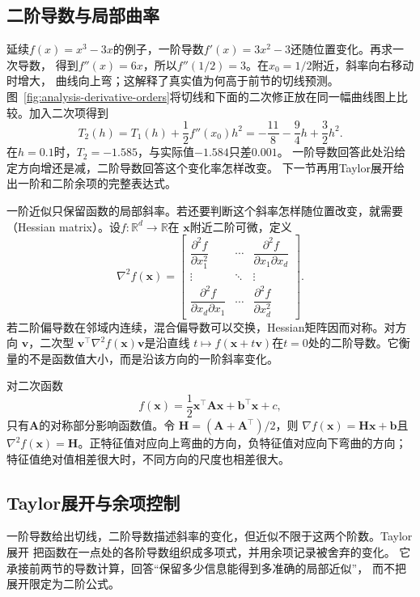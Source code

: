 \subsection{二阶导数与局部曲率}
\label{sec:analysis-second-order-curvature}

延续$f(x)=x^3-3x$的例子，一阶导数$f'(x)=3x^2-3$还随位置变化。再求一次导数，
得到$f''(x)=6x$，所以$f''(1/2)=3$。在$x_0=1/2$附近，斜率向右移动时增大，
曲线向上弯；这解释了真实值为何高于前节的切线预测。图~\ref{fig:analysis-derivative-orders}将切线和下面的二次修正放在同一幅曲线图上比较。加入二次项得到
\begin{equation}
  T_2(h)=T_1(h)+\frac12f''(x_0)h^2
        =-\frac{11}{8}-\frac94h+\frac32h^2.
\label{eq:analysis-cubic-quadratic-model}
\end{equation}
在$h=0.1$时，$T_2=-1.585$，与实际值$-1.584$只差$0.001$。
一阶导数回答此处沿给定方向增还是减，二阶导数回答这个变化率怎样改变。
下一节再用Taylor展开给出一阶和二阶余项的完整表达式。

一阶近似只保留函数的局部斜率。若还要判断这个斜率怎样随位置改变，就需要
（Hessian matrix）。设$f:\mathbb{R}^d\to\mathbb{R}$在 $\bm{x}$附近二阶可微，定义
\[   \nabla^2 f(\bm{x})   =
\begin{bmatrix}     \dfrac{\partial^2 f}{\partial x_1^2} &     \cdots &     \dfrac{\partial^2 f}{\partial x_1\partial x_d}\\     \vdots & \ddots & \vdots\\     \dfrac{\partial^2 f}{\partial x_d\partial x_1} &     \cdots &     \dfrac{\partial^2 f}{\partial x_d^2}
\end{bmatrix}. \]
若二阶偏导数在邻域内连续，混合偏导数可以交换，Hessian矩阵因而对称。对方向 $\bm{v}$，二次型 $\bm{v}^{\top}\nabla^2f(\bm{x})\bm{v}$是沿直线 $t\mapsto f(\bm{x}+t\bm{v})$在$t=0$处的二阶导数。它衡量的不是函数值大小，而是沿该方向的一阶斜率变化。

对二次函数
\[   f(\bm{x})   =   \frac12\bm{x}^{\top}\bm{A}\bm{x}   +\bm{b}^{\top}\bm{x}+c, \]
只有$\bm{A}$的对称部分影响函数值。令 $\bm{H}=(\bm{A}+\bm{A}^{\top})/2$，则 $\nabla f(\bm{x})=\bm{H}\bm{x}+\bm{b}$且 $\nabla^2f(\bm{x})=\bm{H}$。正特征值对应向上弯曲的方向，负特征值对应向下弯曲的方向；特征值绝对值相差很大时，不同方向的尺度也相差很大。

\subsection{Taylor展开与余项控制}
\label{sec:analysis-taylor-approximation}
一阶导数给出切线，二阶导数描述斜率的变化，但近似不限于这两个阶数。Taylor展开
把函数在一点处的各阶导数组织成多项式，并用余项记录被舍弃的变化。
它承接前两节的导数计算，回答“保留多少信息能得到多准确的局部近似”，
而不把展开限定为二阶公式。

